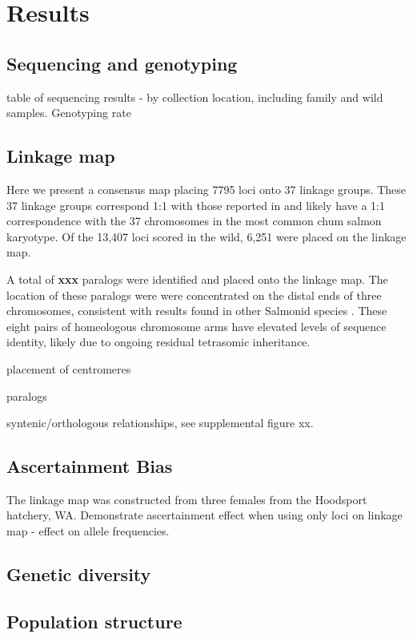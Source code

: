 \documentclass[12pt, one column]{article}
\begin{document}
\section*{Results}
\subsection*{Sequencing and genotyping}
table of sequencing results -  by collection location, including family and wild samples.
Genotyping rate

\subsection*{Linkage map}
Here we present a consensus map placing 7795 loci onto 37 linkage groups.  These 37 linkage groups correspond 1:1 with those reported in \citep{Waples2015} and likely have a 1:1 correspondence with the 37 chromosomes in the most common chum salmon karyotype\citep{Phillips2001}. Of the 13,407 loci scored in the wild, 6,251 were placed on the linkage map. 

A total of \textbf{xxx} paralogs were identified and placed onto the linkage map.  The location of these paralogs were were concentrated on the distal ends of three chromosomes, consistent with results found in other Salmonid species  \citep{Brieuc2014, Kodama2014, Waples2015}. These eight pairs of homeologous chromosome arms have elevated levels of sequence identity, likely due to ongoing residual tetrasomic inheritance.

placement of centromeres

paralogs

syntenic/orthologous relationships, see supplemental figure xx.

\subsection*{Ascertainment Bias}
The linkage map was constructed from three females from the Hoodsport hatchery, WA.  Demonstrate ascertainment effect when using only loci on linkage map - effect on allele frequencies.

\subsection*{Genetic diversity}

\subsection*{Population structure}
\end{document}
